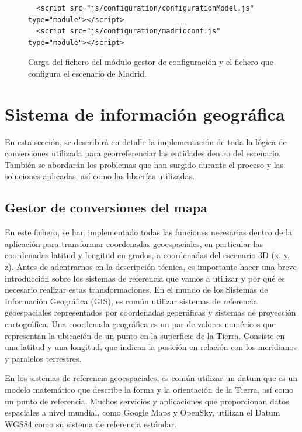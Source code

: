 \documentclass[a4paper, 11pt]{book}
\begin{document}
\begin{figure}[H]
\centering
\begin{verbatim}
  <script src="js/configuration/configurationModel.js" type="module"></script>
  <script src="js/configuration/madridconf.js" type="module"></script>
\end{verbatim}
\caption{Carga del fichero del módulo gestor de configuración y el fichero que configura el escenario de Madrid.
\label{codigo:cargaConfiguracion}}
\end{figure}

\clearpage
\section{Sistema de información geográfica}
\label{sec:gis}
En esta sección, se describirá en detalle la implementación de toda la lógica de conversiones utilizada para georreferenciar las entidades dentro del escenario. También se abordarán los problemas que han surgido durante el proceso y las soluciones aplicadas, así como las librerías utilizadas.
\subsection{Gestor de conversiones del mapa}
\label{subsec:mapConversion}
En este fichero, se han implementado todas las funciones necesarias dentro de la aplicación para transformar coordenadas geoespaciales, en particular las coordenadas latitud y longitud en grados, a coordenadas del escenario 3D (x, y, z).
Antes de adentrarnos en la descripción técnica, es importante hacer una breve introducción sobre los sistemas de referencia que vamos a utilizar y por qué es necesario realizar estas transformaciones.
En el mundo de los Sistemas de Información Geográfica (GIS), es común utilizar sistemas de referencia geoespaciales representados por coordenadas geográficas y sistemas de proyección cartográfica.
Una coordenada geográfica es un par de valores numéricos que representan la ubicación de un punto en la superficie de la Tierra. Consiste en una latitud y una longitud, que indican la posición en relación con los meridianos y paralelos terrestres.

En los sistemas de referencia geoespaciales, es común utilizar un datum que es un modelo matemático que describe la forma y la orientación de la Tierra, así como un punto de referencia. Muchos servicios y aplicaciones que proporcionan datos espaciales a nivel mundial, como Google Maps y OpenSky, utilizan el Datum WGS84 como su sistema de referencia estándar.
\end{document}
